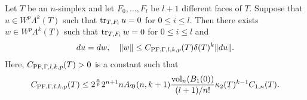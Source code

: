 \documentclass[10pt,letterpaper]{article}
\begin{document}
\begin{lemma}\label{lemma:mixedbconsimplex:exteriorderivative}
    Let $T$ be an $n$-simplex 
    and let $F_{0},\dots,F_{l}$ be $l+1$ different faces of $T$. 
    Suppose that $u \in W^{p}\Lambda^{k}(T)$ such that 
    $\operatorname{tr}_{T,F_i} u = 0$ for $0 \leq i \leq l$.
    Then there exists $w \in W^{p}\Lambda^{k}(T)$ such that 
    $\operatorname{tr}_{T,F_i} w = 0$ for $0 \leq i \leq l$
    and  
    \begin{align*}
        d u = d w,
        \quad 
        \| w \| 
        \leq 
        C_{{\rm PF},\Gamma,l,k,p}(T)
        {\delta}(T)^{k} 
        \| d u \|
        .
    \end{align*}
    Here, $C_{{\rm PF},\Gamma,l,k,p}(T) > 0$ is a constant such that 
    \begin{align*}
        C_{{\rm PF},\Gamma,l,k,p}(T)
        \leq 
        2^{\frac n p}
        2^{n+1} n A_{{\mathfrak B}}(n,k+1) \frac{ \operatorname{vol}_{n}(B_1(0)) }{ (l+1)/n! } 
        \kappa_{2}(T)^{k-1}
        C_{1,n}(T)
        .
    \end{align*}
\end{lemma}
\end{document}
